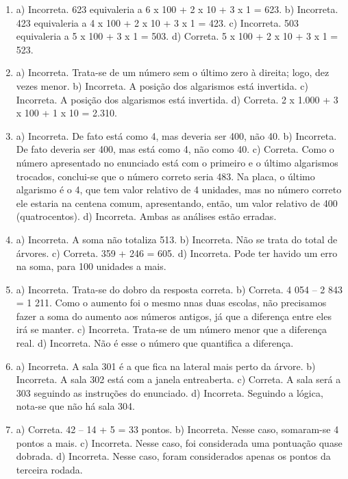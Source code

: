 
\begin{enumerate}
\item
a) Incorreta. 623 equivaleria a 6 x 100 + 2 x 10 + 3 x 1 = 623.
b) Incorreta. 423 equivaleria a 4 x 100 + 2 x 10 + 3 x 1 = 423.
c) Incorreta. 503 equivaleria a 5 x 100 + 3 x 1 = 503.
d) Correta. 5 x 100 + 2 x 10 + 3 x 1 = 523.

\item
a) Incorreta. Trata-se de um número sem o último zero à direita; logo, dez vezes menor.
b) Incorreta. A posição dos algarismos está invertida.
c) Incorreta. A posição dos algarismos está invertida.
d) Correta. 2 x 1.000 + 3 x 100 + 1 x 10 = 2.310.

\item
a) Incorreta. De fato está como 4, mas deveria ser 400, não 40.
b) Incorreta. De fato deveria ser 400, mas está como 4, não como 40.
c) Correta. Como o número apresentado no enunciado está com o primeiro e o último
algarismos trocados, conclui-se que o número correto seria 483. Na placa,
o último algarismo é o 4, que tem valor relativo de 4 unidades, mas no
número correto ele estaria na centena comum, apresentando, então, um valor
relativo de 400 (quatrocentos).
d) Incorreta. Ambas as análises estão erradas.

\item
a) Incorreta. A soma não totaliza 513.
b) Incorreta. Não se trata do total de árvores.
c) Correta. 359 + 246 = 605.
d) Incorreta. Pode ter havido um erro na soma, para 100 unidades a mais.

\item
a) Incorreta. Trata-se do dobro da resposta correta.
b) Correta. 4 054 -- 2 843 = 1 211. Como o aumento foi o mesmo nnas duas escolas, não
precisamos fazer a soma do aumento aos números antigos, já que a diferença entre eles irá se manter.
c) Incorreta. Trata-se de um número menor que a diferença real.
d) Incorreta. Não é esse o número que quantifica a diferença.

\item
a) Incorreta. A sala 301 é a que fica na lateral mais perto da árvore.
b) Incorreta. A sala 302 está com a janela entreaberta.
c) Correta. A sala será a 303 seguindo as instruções do enunciado.
d) Incorreta. Seguindo a lógica, nota-se que não há sala 304.

\item
a) Correta. 42 -- 14 + 5 = 33 pontos.
b) Incorreta. Nesse caso, somaram-se 4 pontos a mais.
c) Incorreta. Nesse caso, foi considerada uma pontuação quase dobrada.
d) Incorreta. Nesse caso, foram considerados apenas os pontos da terceira rodada.


\end{enumerate}
